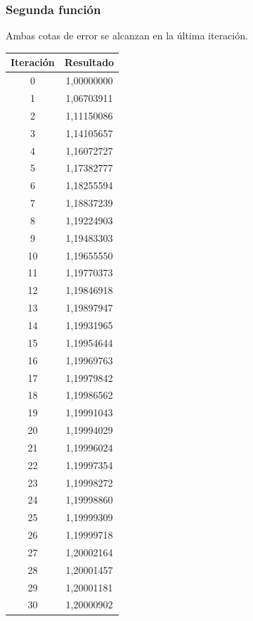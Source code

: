 \documentclass[titlepage,a4paper]{article}
\begin{document}
\subsubsection{Segunda función}\label{sec:NR2}
Ambas cotas de error se alcanzan en la última iteración.
\begin{tabular}{| c | c |}
\hline
 Iteración & Resultado \\ \hline
    0     & 1,00000000 \\
    1     & 1,06703911 \\
    2     & 1,11150086 \\
    3     & 1,14105657 \\
    4     & 1,16072727 \\
    5     & 1,17382777 \\
    6     & 1,18255594 \\
    7     & 1,18837239 \\
    8     & 1,19224903 \\
    9     & 1,19483303 \\
    10    & 1,19655550 \\
    11    & 1,19770373 \\
    12    & 1,19846918 \\
    13    & 1,19897947 \\
    14    & 1,19931965 \\
    15    & 1,19954644 \\
    16    & 1,19969763 \\
    17    & 1,19979842 \\
    18    & 1,19986562 \\
    19    & 1,19991043 \\
    20    & 1,19994029 \\
    21    & 1,19996024 \\
    22    & 1,19997354 \\
    23    & 1,19998272 \\
    24    & 1,19998860 \\
    25    & 1,19999309 \\
    26    & 1,19999718 \\
    27    & 1,20002164 \\
    28    & 1,20001457 \\
    29    & 1,20001181 \\
    30    & 1,20000902 \\
\hline
\end{tabular}
\end{document}
